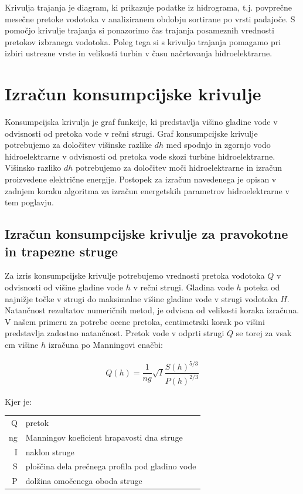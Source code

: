 Krivulja trajanja je diagram, ki prikazuje podatke iz hidrograma, t.j. povprečne mesečne pretoke vodotoka v analiziranem obdobju sortirane po vrsti padajoče. S pomočjo krivulje trajanja si ponazorimo čas trajanja posameznih vrednosti pretokov izbranega vodotoka. Poleg tega si s krivuljo trajanja pomagamo pri izbiri ustrezne vrste in velikosti turbin v času načrtovanja hidroelektrarne.


\section{Izračun konsumpcijske krivulje}
Konsumpcijska krivulja je graf funkcije, ki predstavlja višino gladine vode v odvisnosti od pretoka vode v rečni strugi. Graf konsumpcijske krivulje potrebujemo za določitev višinske razlike $dh$ med spodnjo in zgornjo vodo hidroelektrarne v odvisnosti od pretoka vode skozi turbine hidroelektrarne. Višinsko razliko $dh$ potrebujemo za določitev moči hidroelektrarne in izračun proizvedene električne energije. Postopek za izračun navedenega je opisan v zadnjem koraku algoritma za izračun energetskih parametrov hidroelektrarne v tem poglavju.



\subsection{Izračun konsumpcijske krivulje za pravokotne in trapezne struge} \label{sec:teorija_trapeznaMetoda}
Za izris konsumpcijske krivulje potrebujemo vrednosti pretoka vodotoka $Q$ v odvisnosti od višine gladine vode $h$ v rečni strugi. Gladina vode $h$ poteka od najnižje točke v strugi do maksimalne višine gladine vode v strugi vodotoka $H$. Natančnost rezultatov numeričnih metod, je odvisna od velikosti koraka izračuna. V našem primeru za potrebe ocene pretoka, centimetrski korak po višini predstavlja zadostno natančnost. Pretok vode v odprti strugi $Q$ se torej za vsak cm višine $h$ izračuna po Manningovi enačbi: 

\begin{ceqn}
\begin{align}
Q(h) = \dfrac{1}{ng} \sqrt{I}\dfrac{S(h)^{5/3}}{P(h)^{2/3}} \label{eq:ManningovaEnacba}
\end{align}
\end{ceqn}

Kjer je:

\begin{table}[htb!]
	\begin{tabular}{r|p{10cm}}
		Q & pretok \\
		ng & Manningov koeficient hrapavosti dna struge\\
		I & naklon struge \\
		S & ploščina dela prečnega profila pod gladino vode\\
		P & dolžina omočenega oboda struge
	\end{tabular}
\end{table}


